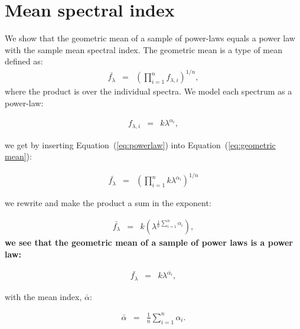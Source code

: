 \documentclass{aa}    %
\newcommand{\Eq}[1]{Equation~(\ref{eq:#1})}
\newcommand{\eq}[1]{\Eq{#1}}
\newcommand{\eqlabel}[1]{\label{eq:#1}}
\newcommand{\sectlabel}[1]{\label{sect:#1}}
\begin{document}


\clearpage



\appendix

\section{Mean spectral index}  \sectlabel{math} \label{math}


We show that the geometric mean of a sample of power-laws equals a power law
with the sample mean spectral index. The geometric mean is a type of mean
defined as:
\begin{eqnarray}\eqlabel{geometric mean}
\bar{f_{\lambda}} &=&  \left( \prod_{i=1}^n f_{\lambda, i} \right) ^{1/n},
\end{eqnarray}
where the product is over the individual spectra. We model each spectrum as a
power-law:

\begin{eqnarray}\eqlabel{powerlaw}
f_{\lambda, i} &=&  k \lambda ^{\alpha_{i}},
\end{eqnarray}

 we get by inserting \eq{powerlaw} into \eq{geometric mean}:
 
 \begin{eqnarray}\eqlabel{deriv1}
 \bar{f_{\lambda}} &=&  \left( \prod_{i=1}^n k \lambda ^{\alpha_{i}}\right)
^{1/n}
 \end{eqnarray}

we rewrite and make the product a sum in the exponent:

 \begin{eqnarray}\eqlabel{deriv2}
 \bar{f_{\lambda}} &=&  k \left( \lambda ^{ \frac{1}{n} \sum_{i=1}^n \alpha_{i} 
}\right) ,
 \end{eqnarray}
\textbf{we see that the geometric mean of a sample of power laws is a power law:}

 \begin{eqnarray}\eqlabel{deriv3}
 \bar{f_{\lambda}} &=&  k \lambda ^{ \bar{\alpha_{i} }},
 \end{eqnarray}

with the mean index, $\bar{\alpha}$:

 \begin{eqnarray}\eqlabel{mean}
 \bar{\alpha} &=&  \frac{1}{n} \sum_{i=1}^n \alpha_{i} .
 \end{eqnarray}
\end{document}
